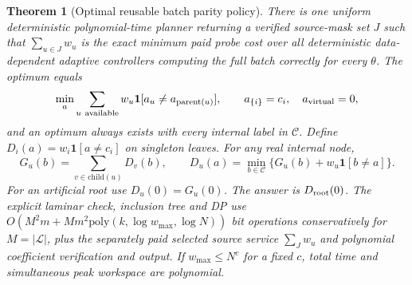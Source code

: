 \documentclass[11pt]{article}
\newtheorem{theorem}{Theorem}
\begin{document}
\begin{theorem}[Optimal reusable batch parity policy]
There is one uniform deterministic polynomial-time planner returning a verified source-mask set $J$ such that $\sum_{u\in J}w_u$ is the exact minimum paid probe cost over \emph{all} deterministic data-dependent adaptive controllers computing the full batch correctly for every $\theta$. The optimum equals
\[
 \min_a\sum_{u\ {\rm available}}w_u\mathbf1[a_u\ne a_{\mathrm{parent}(u)}],
 \qquad a_{\{i\}}=c_i,\quad a_{\rm virtual}=0,
\]
and an optimum always exists with every internal label in $\mathcal C$. Define $D_i(a)=w_i\mathbf1[a\ne c_i]$ on singleton leaves. For any real internal node,
\[
 G_u(b)=\sum_{v\in\mathrm{child}(u)}D_v(b),\qquad
 D_u(a)=\min_{b\in\mathcal C}\{G_u(b)+w_u\mathbf1[b\ne a]\}.
\]
For an artificial root use $D_u(0)=G_u(0)$. The answer is $D_{\rm root}(0)$. The explicit laminar check, inclusion tree and DP use $O(M^2m+Mm^2\mathrm{poly}(k,\log w_{\max},\log N))$ bit operations conservatively for $M=|\mathcal L|$, plus the separately paid selected source service $\sum_{J}w_u$ and polynomial coefficient verification and output. If $w_{\max}\le N^c$ for a fixed $c$, total time and simultaneous peak workspace are polynomial.
\end{theorem}
\end{document}
